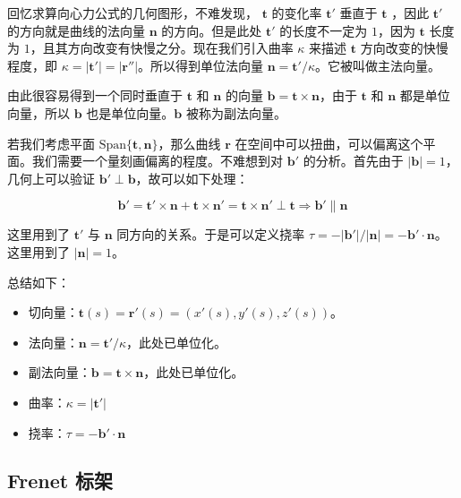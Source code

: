 \documentclass[a4paper, 12pt]{article}
\begin{document}
    回忆求算向心力公式的几何图形，不难发现， $\boldsymbol t$ 的变化率 $\boldsymbol t'$ 垂直于 $\boldsymbol t$ ，因此 $\boldsymbol t'$ 的方向就是曲线的法向量 $\boldsymbol n$ 的方向。但是此处 $\boldsymbol t'$ 的长度不一定为 $1$，因为 $\boldsymbol t$ 长度为 $1$，且其方向改变有快慢之分。现在我们引入曲率 $\kappa$ 来描述 $\boldsymbol t$ 方向改变的快慢程度，即 $\kappa = |\boldsymbol t'|=|\boldsymbol r''|$。所以得到单位法向量 $\boldsymbol n=\boldsymbol t'/\kappa$。它被叫做主法向量。

    由此很容易得到一个同时垂直于 $\boldsymbol t$ 和 $\boldsymbol n$ 的向量 $\boldsymbol b = \boldsymbol t \times \boldsymbol n$，由于 $\boldsymbol t$ 和 $\boldsymbol n$ 都是单位向量，所以 $\boldsymbol b$ 也是单位向量。$\boldsymbol b$ 被称为副法向量。

    若我们考虑平面 $\mathrm{Span}\{\boldsymbol t, \boldsymbol n\}$，那么曲线 $\boldsymbol r$ 在空间中可以扭曲，可以偏离这个平面。我们需要一个量刻画偏离的程度。不难想到对 $\boldsymbol b'$ 的分析。首先由于 $|\boldsymbol b|=1$，几何上可以验证 $\boldsymbol b' \perp \boldsymbol b$，故可以如下处理：

    \[
    \boldsymbol b'=\boldsymbol t' \times \boldsymbol n + \boldsymbol t \times \boldsymbol n' = \boldsymbol t \times \boldsymbol n' \perp \boldsymbol t \Rightarrow \boldsymbol b' \parallel \boldsymbol n
    \]

    这里用到了 $\boldsymbol t'$ 与 $\boldsymbol n$ 同方向的关系。于是可以定义挠率 $\tau = -|\boldsymbol b'|/|\boldsymbol n|=-\boldsymbol b' \cdot \boldsymbol n$。这里用到了 $|\boldsymbol n|=1$。

    总结如下：

    \begin{itemize}
        \item 切向量：$\boldsymbol t(s) = \boldsymbol r'(s)=(x'(s), y'(s), z'(s))$。
        \item 法向量：$\boldsymbol n = \boldsymbol t'/\kappa$，此处已单位化。
        \item 副法向量：$\boldsymbol b = \boldsymbol t \times \boldsymbol n$，此处已单位化。
        \item 曲率：$\kappa = |\boldsymbol t'|$
        \item 挠率：$\tau = -\boldsymbol b' \cdot \boldsymbol n$
    \end{itemize}

    \subsection{Frenet 标架}
\end{document}
